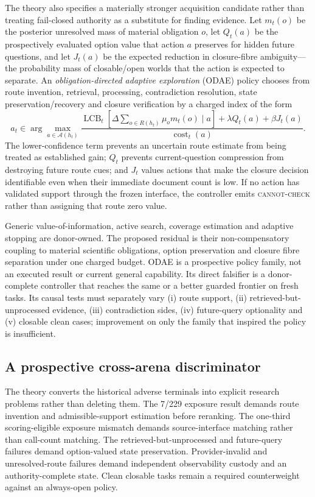 The theory also specifies a materially stronger acquisition candidate rather
than treating fail-closed authority as a substitute for finding evidence.  Let
$m_t(o)$ be the posterior unresolved mass of material obligation $o$, let
$Q_t(a)$ be the prospectively evaluated option value that action $a$ preserves
for hidden future questions, and let $J_t(a)$ be the expected reduction in
closure-fibre ambiguity---the probability mass of closable/open worlds that the
action is expected to separate.  An \emph{obligation-directed adaptive
exploration} (ODAE) policy chooses from route invention, retrieval, processing,
contradiction resolution, state preservation/recovery and closure verification
by a charged index of the form
\[
 a_t\in\arg\max_{a\in\mathcal A(h_t)}
 \frac{
   \operatorname{LCB}_t\!\left[
     \Delta\sum_{o\in R(h_t)}\mu_o m_t(o)\mid a
   \right]
   +\lambda Q_t(a)+\beta J_t(a)
 }{\operatorname{cost}_t(a)}.
\]
The lower-confidence term prevents an uncertain route estimate from being
treated as established gain; $Q_t$ prevents current-question compression from
destroying future route cues; and $J_t$ values actions that make the closure
decision identifiable even when their immediate document count is low.  If no
action has validated support through the frozen interface, the controller emits
\textsc{cannot-check} rather than assigning that route zero value.

Generic value-of-information, active search, coverage estimation and adaptive
stopping are donor-owned.  The proposed residual is their non-compensatory
coupling to material scientific obligations, option preservation and closure
fibre separation under one charged budget.  ODAE is a prospective policy family,
not an executed result or current general capability.  Its direct falsifier is a
donor-complete controller that reaches the same or a better guarded frontier on
fresh tasks.  Its causal tests must separately vary (i) route support, (ii)
retrieved-but-unprocessed evidence, (iii) contradiction sides, (iv) future-query
optionality and (v) closable clean cases; improvement on only the family that
inspired the policy is insufficient.

\subsection{A prospective cross-arena discriminator}

The theory converts the historical adverse terminals into explicit research
problems rather than deleting them.  The 7/229 exposure result demands route
invention and admissible-support estimation before reranking.  The one-third
scoring-eligible exposure mismatch demands source-interface matching rather
than call-count matching.  The retrieved-but-unprocessed and future-query
failures demand option-valued state preservation.  Provider-invalid and
unresolved-route failures demand independent observability custody and an
authority-complete state.  Clean closable tasks remain a required counterweight
against an always-open policy.

